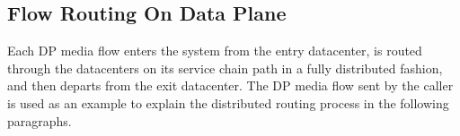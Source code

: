 \begin{comment}
\begin{equation}
0 \leq i \leq n-1, 0 \leq j \leq m+1
\label{eq1}
\end{equation}
\begin{equation}
N(0, 0) = 0, N(i, 0) = +\infty, i \geq 1
\label{eq2}
\end{equation}
\begin{equation}
N(0, j) =  N(0, j-1)+num(0,j), j \geq 1
\label{eq3}
\end{equation}
\begin{equation}
\resizebox{\columnwidth}{!}{$N(i, j) = min\{ N(i-1, j-1)+num(i, j), N(i, j-1)+num(i,j) \}$},\nonumber\\
\label{eq4}
\end{equation}
\begin{equation}
~~~~~~~~~~~~~~~~~~~~~~~~~~~i \geq 1~\text{and}~j \geq 1
\label{eq5}
\end{equation}
\begin{equation}
\resizebox{\columnwidth}{!}{
$num(i,j)=
  \begin{cases}
    0, \text{if $Q'_{i,j} \geq Q$ and $m-j+1 \geq n-i-1$}\\
    \lceil(Q-Q'_{i,j})/C_j\rceil, \text{if $Q'_{i,j}<Q$ and $m-j+1 \geq n-i-1$}\\
    +\infty, \text{if $m-j+1<n-i-1$}
  \end{cases}$}
 \label{eq6}
 \end{equation}
\end{comment}


\vspace{-3mm}
\subsection{Flow Routing On Data Plane}
\label{sec:flow-routing-on-dp}


Each DP media flow enters the system from the entry datacenter, is routed through the datacenters on its service chain path in a fully distributed fashion, and then departs from the exit datacenter. The DP media flow sent by the caller is used as an example to explain the distributed routing process in the following paragraphs. %

